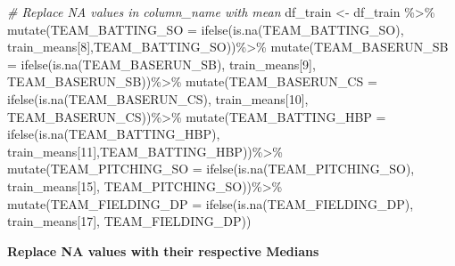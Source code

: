 \documentclass[
]{article}
\newenvironment{Shaded}{\begin{snugshade}}{\end{snugshade}}
\newcommand{\AttributeTok}[1]{\textcolor[rgb]{0.77,0.63,0.00}{#1}}
\newcommand{\CommentTok}[1]{\textcolor[rgb]{0.56,0.35,0.01}{\textit{#1}}}
\newcommand{\DecValTok}[1]{\textcolor[rgb]{0.00,0.00,0.81}{#1}}
\newcommand{\FunctionTok}[1]{\textcolor[rgb]{0.00,0.00,0.00}{#1}}
\newcommand{\NormalTok}[1]{#1}
\newcommand{\OtherTok}[1]{\textcolor[rgb]{0.56,0.35,0.01}{#1}}
\newcommand{\SpecialCharTok}[1]{\textcolor[rgb]{0.00,0.00,0.00}{#1}}
\begin{document}
\begin{Shaded}
\begin{Highlighting}[]
\CommentTok{\# Replace NA values in \textquotesingle{}column\_name\textquotesingle{} with \textquotesingle{}mean\textquotesingle{}}
\NormalTok{df\_train }\OtherTok{\textless{}{-}}\NormalTok{ df\_train }\SpecialCharTok{\%\textgreater{}\%}
  \FunctionTok{mutate}\NormalTok{(}\AttributeTok{TEAM\_BATTING\_SO =}
           \FunctionTok{ifelse}\NormalTok{(}\FunctionTok{is.na}\NormalTok{(TEAM\_BATTING\_SO),}
\NormalTok{                  train\_means[}\DecValTok{8}\NormalTok{],TEAM\_BATTING\_SO))}\SpecialCharTok{\%\textgreater{}\%} 
  \FunctionTok{mutate}\NormalTok{(}\AttributeTok{TEAM\_BASERUN\_SB =} 
           \FunctionTok{ifelse}\NormalTok{(}\FunctionTok{is.na}\NormalTok{(TEAM\_BASERUN\_SB),}
\NormalTok{                  train\_means[}\DecValTok{9}\NormalTok{], TEAM\_BASERUN\_SB))}\SpecialCharTok{\%\textgreater{}\%}
  \FunctionTok{mutate}\NormalTok{(}\AttributeTok{TEAM\_BASERUN\_CS =}
           \FunctionTok{ifelse}\NormalTok{(}\FunctionTok{is.na}\NormalTok{(TEAM\_BASERUN\_CS),}
\NormalTok{                  train\_means[}\DecValTok{10}\NormalTok{], TEAM\_BASERUN\_CS))}\SpecialCharTok{\%\textgreater{}\%}
  \FunctionTok{mutate}\NormalTok{(}\AttributeTok{TEAM\_BATTING\_HBP =} 
           \FunctionTok{ifelse}\NormalTok{(}\FunctionTok{is.na}\NormalTok{(TEAM\_BATTING\_HBP),}
\NormalTok{                  train\_means[}\DecValTok{11}\NormalTok{],TEAM\_BATTING\_HBP))}\SpecialCharTok{\%\textgreater{}\%}
  \FunctionTok{mutate}\NormalTok{(}\AttributeTok{TEAM\_PITCHING\_SO =}
           \FunctionTok{ifelse}\NormalTok{(}\FunctionTok{is.na}\NormalTok{(TEAM\_PITCHING\_SO),}
\NormalTok{                  train\_means[}\DecValTok{15}\NormalTok{], TEAM\_PITCHING\_SO))}\SpecialCharTok{\%\textgreater{}\%}
  \FunctionTok{mutate}\NormalTok{(}\AttributeTok{TEAM\_FIELDING\_DP =}
           \FunctionTok{ifelse}\NormalTok{(}\FunctionTok{is.na}\NormalTok{(TEAM\_FIELDING\_DP),}
\NormalTok{                  train\_means[}\DecValTok{17}\NormalTok{], TEAM\_FIELDING\_DP))}
\end{Highlighting}
\end{Shaded}

\textbf{Replace NA values with their respective Medians}
\end{document}
